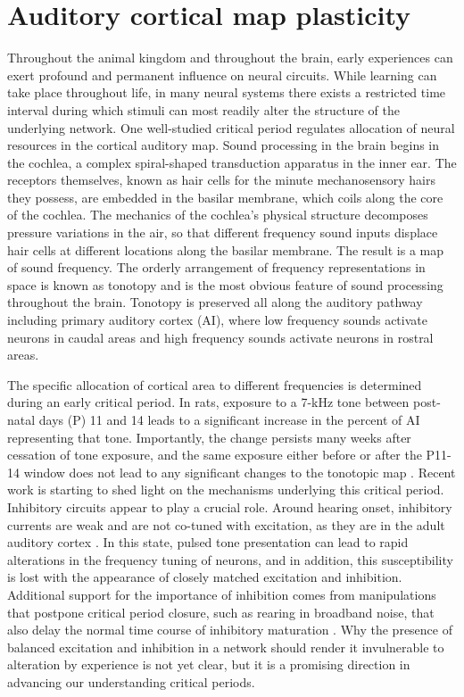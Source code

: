 \section{Auditory cortical map plasticity}

Throughout the animal kingdom and throughout the brain, early experiences can exert profound and permanent influence on neural circuits. While learning can take place throughout life, in many neural systems there exists a restricted time interval during which stimuli can most readily alter the structure of the underlying network. One well-studied critical period regulates allocation of neural resources in the cortical auditory map. Sound processing in the brain begins in the cochlea, a complex spiral-shaped transduction apparatus in the inner ear. The receptors themselves, known as hair cells for the minute mechanosensory hairs they possess, are embedded in the basilar membrane, which coils along the core of the cochlea. The mechanics of the cochlea's physical structure decomposes pressure variations in the air, so that different frequency sound inputs displace hair cells at different locations along the basilar membrane. The result is a map of sound frequency. The orderly arrangement of frequency representations in space is known as tonotopy and is the most obvious feature of sound processing throughout the brain. Tonotopy is preserved all along the auditory pathway including primary auditory cortex (AI), where low frequency sounds activate neurons in caudal areas and high frequency sounds activate neurons in rostral areas.

The specific allocation of cortical area to different frequencies is determined during an early critical period. In rats, exposure to a 7-kHz tone between post-natal days (P) 11 and 14 leads to a significant increase in the percent of AI representing that tone. Importantly, the change persists many weeks after cessation of tone exposure, and the same exposure either before or after the P11-14 window does not lead to any significant changes to the tonotopic map \cite{DeVillers-Sidani2007}. Recent work is starting to shed light on the mechanisms underlying this critical period. Inhibitory circuits appear to play a crucial role. Around hearing onset, inhibitory currents are weak and are not co-tuned with excitation, as they are in the adult auditory cortex \cite{Dorrn2010}. In this state, pulsed tone presentation can lead to rapid alterations in the frequency tuning of neurons, and in addition, this susceptibility is lost with the appearance of closely matched excitation and inhibition. Additional support for the importance of inhibition comes from manipulations that postpone critical period closure, such as rearing in broadband noise, that also delay the normal time course of inhibitory maturation \cite{DeVillers-Sidani2008}. Why the presence of balanced excitation and inhibition in a network should render it invulnerable to alteration by experience is not yet clear, but it is a promising direction in advancing our understanding critical periods.

